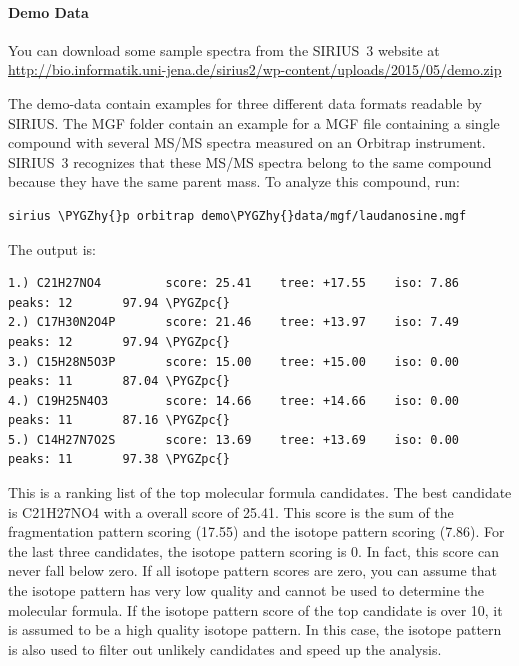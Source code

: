\documentclass[letterpaper,10pt,openany,oneside]{sphinxmanual}
\def\PYGZpc{\char`\%}
\def\PYGZhy{\char`\-}
\begin{document}
\paragraph{Demo Data}
\label{commandline:demo-data}
You can download some sample spectra from the SIRIUS~3 website at \url{http://bio.informatik.uni-jena.de/sirius2/wp-content/uploads/2015/05/demo.zip}

The demo-data contain examples for three different data formats readable by SIRIUS. The MGF folder contain an example for a MGF file containing a single compound with several MS/MS spectra measured on an Orbitrap instrument. SIRIUS~3 recognizes that these MS/MS spectra belong to the same compound because they have the same parent mass. To analyze this compound, run:

\begin{Verbatim}[commandchars=\\\{\}]
sirius \PYGZhy{}p orbitrap demo\PYGZhy{}data/mgf/laudanosine.mgf
\end{Verbatim}

The output is:

\begin{Verbatim}[commandchars=\\\{\}]
1.) C21H27NO4         score: 25.41    tree: +17.55    iso: 7.86       peaks: 12       97.94 \PYGZpc{}
2.) C17H30N2O4P       score: 21.46    tree: +13.97    iso: 7.49       peaks: 12       97.94 \PYGZpc{}
3.) C15H28N5O3P       score: 15.00    tree: +15.00    iso: 0.00       peaks: 11       87.04 \PYGZpc{}
4.) C19H25N4O3        score: 14.66    tree: +14.66    iso: 0.00       peaks: 11       87.16 \PYGZpc{}
5.) C14H27N7O2S       score: 13.69    tree: +13.69    iso: 0.00       peaks: 11       97.38 \PYGZpc{}
\end{Verbatim}

This is a ranking list of the top molecular formula candidates. The best candidate is C21H27NO4 with a overall score of 25.41. This score is the sum of the fragmentation pattern scoring (17.55) and the isotope pattern scoring (7.86). For the last three candidates, the isotope pattern scoring is 0. In fact, this score can never fall below zero. If all isotope pattern scores are zero, you can assume that the isotope pattern has very low quality and cannot be used to determine the molecular formula. If the isotope pattern score of the top candidate is over 10, it is assumed to be a high quality isotope pattern. In this case, the isotope pattern is also used to filter out unlikely candidates and speed up the analysis.
\end{document}
